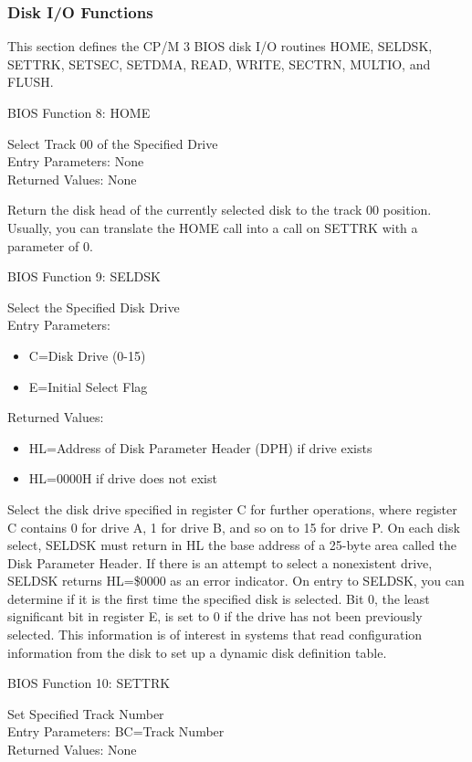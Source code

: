 \subsubsection{Disk I/O Functions}
This section defines the CP/M 3 BIOS disk I/O routines HOME, SELDSK,
SETTRK, SETSEC, SETDMA, READ, WRITE, SECTRN, MULTIO, and FLUSH.

BIOS Function 8: HOME

Select Track 00 of the Specified Drive\\
Entry Parameters: None\\
Returned Values: None

Return the disk head of the currently selected disk to the track 00
position. Usually, you can translate the HOME call into a call on
SETTRK with a parameter of 0.

BIOS Function 9: SELDSK

Select the Specified Disk Drive\\
Entry Parameters:
\begin{itemize}
\item[] C=Disk Drive (0-15)
\item[] E=Initial Select Flag
\end{itemize}
Returned Values:
\begin{itemize}
\item[] HL=Address of Disk Parameter Header (DPH) if drive exists
\item[] HL=0000H if drive does not exist
\end{itemize}
Select the disk drive specified in register C for further operations,
where register C contains 0 for drive A, 1 for drive B, and so on to
15 for drive P. On each disk select, SELDSK must return in HL the base
address of a 25-byte area called the Disk Parameter Header. If there
is an attempt to select a nonexistent drive, SELDSK returns HL=\$0000
as an error indicator.  On entry to SELDSK, you can determine if it is
the first time the specified disk is selected. Bit 0, the least
significant bit in register E, is set to 0 if the drive has not been
previously selected. This information is of interest in systems that
read configuration information from the disk to set up a dynamic disk
definition table.

BIOS Function 10: SETTRK

Set Specified Track Number\\
Entry Parameters: BC=Track Number\\
Returned Values: None

